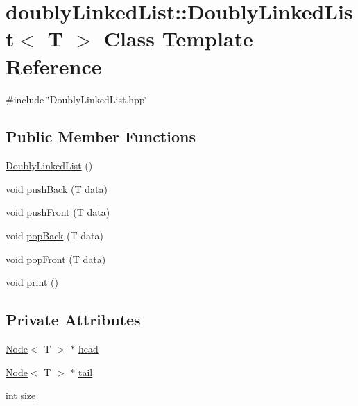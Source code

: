 \hypertarget{classdoublyLinkedList_1_1DoublyLinkedList}{\section{doubly\-Linked\-List\-:\-:Doubly\-Linked\-List$<$ T $>$ Class Template Reference}
\label{classdoublyLinkedList_1_1DoublyLinkedList}
}


{\ttfamily \#include \char`\"{}Doubly\-Linked\-List.\-hpp\char`\"{}}

\subsection*{Public Member Functions}
\begin{DoxyCompactItemize}
\item 
\hyperlink{classdoublyLinkedList_1_1DoublyLinkedList_a2b10fc07de33dbdc2fa37c1765c52946}{Doubly\-Linked\-List} ()
\item 
void \hyperlink{classdoublyLinkedList_1_1DoublyLinkedList_aaecb4b25b712cf777f20de65c87b0629}{push\-Back} (T data)
\item 
void \hyperlink{classdoublyLinkedList_1_1DoublyLinkedList_a4170c12e58db34d356225a05bb9684f1}{push\-Front} (T data)
\item 
void \hyperlink{classdoublyLinkedList_1_1DoublyLinkedList_a53d85f48953602617330b8abdd6efa5b}{pop\-Back} (T data)
\item 
void \hyperlink{classdoublyLinkedList_1_1DoublyLinkedList_ad6714a20e69f0b31d943963b57f563e2}{pop\-Front} (T data)
\item 
void \hyperlink{classdoublyLinkedList_1_1DoublyLinkedList_a61e3cc34cd060e6ed80761cc226f3da5}{print} ()
\end{DoxyCompactItemize}
\subsection*{Private Attributes}
\begin{DoxyCompactItemize}
\item 
\hyperlink{structdoublyLinkedList_1_1Node}{Node}$<$ T $>$ $\ast$ \hyperlink{classdoublyLinkedList_1_1DoublyLinkedList_ab29d146595ee66d859611599bbccc19d}{head}
\item 
\hyperlink{structdoublyLinkedList_1_1Node}{Node}$<$ T $>$ $\ast$ \hyperlink{classdoublyLinkedList_1_1DoublyLinkedList_af31f560be2e8532064d74d1c2466a114}{tail}
\item 
int \hyperlink{classdoublyLinkedList_1_1DoublyLinkedList_a894259d7ab4a0e16bf3a1221d1d4bc75}{size}
\end{DoxyCompactItemize}


